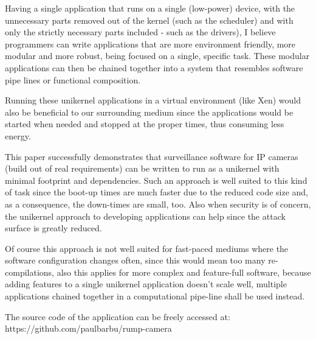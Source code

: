 \documentclass[10pt,a4paper,twoside]{article}
\begin{document}
Having a single application that runs on a single (low-power) device, with the unnecessary parts removed out
of the kernel (such as the scheduler) and with only the strictly necessary parts included - such as the drivers),
I believe programmers can write applications that are more environment friendly,
more modular and more robust, being focused on a single, specific task. These modular applications can
then be chained together into a system that resembles software pipe lines or functional composition.

Running these unikernel applications in a virtual environment (like Xen) would also be
beneficial to our surrounding medium since the applications would be started when
needed and stopped at the proper times, thus consuming less energy. \cite{DataCenterEnergyForeCast} \cite{JinWenChen}

This paper successfully demonstrates that surveillance software for IP cameras
(build out of real requirements) can be written to run as a unikernel with minimal footprint and dependencies.
 Such an approach is well suited to this kind of task since the boot-up times
 are much faster due to the reduced code size and, as a consequence, the down-times are small, too.
 Also when security is of concern, the unikernel approach to developing applications can help since
 the attack surface is greatly reduced.

 Of course this approach is not well suited for fast-paced mediums where the software configuration changes often,
 since this would mean too many re-compilations, also this applies for more complex and feature-full software,
 because adding features to a single unikernel application doesn't scale well,
 multiple applications chained together in a computational pipe-line shall be used instead.

 The source code of the application can be freely accessed at: https://github.com/paulbarbu/rump-camera
\end{document}
